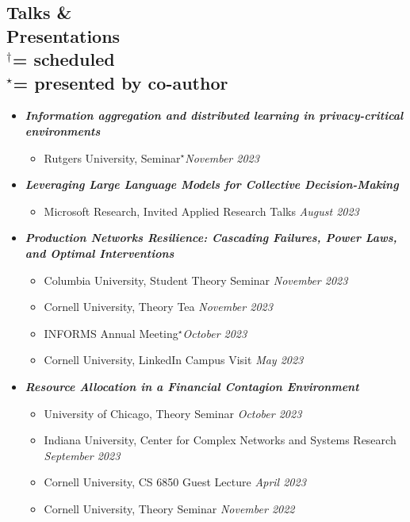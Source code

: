 \documentclass[margin]{res}
\newcommand{\scheduled}[0]{\ensuremath {^\dagger}}
\newcommand{\presentedbycoauthor}[0]{\ensuremath {^{\star}}}
\newcommand{\bemph}[1]{\textbf{\emph{#1}}}
\begin{document}
\begin{resume}
\section{Talks \& \\ Presentations \\
\footnotesize
\scheduled  = \textup{scheduled} \\ \presentedbycoauthor = \textup{presented by co-author}
}

\begin{itemize}[nosep]
	
	\item \bemph{Information aggregation and distributed learning in privacy-critical environments}
	\begin{itemize}[nosep]
	\item Rutgers University, Seminar\presentedbycoauthor \hfill \emph{November 2023}	
	\end{itemize}

	\item \bemph{Leveraging Large Language Models for Collective Decision-Making}
	\begin{itemize}[nosep]
		\item Microsoft Research, Invited Applied Research Talks \hfill \emph{August 2023}
	\end{itemize}

	\item \bemph{Production Networks Resilience: Cascading Failures, Power Laws, and Optimal Interventions}
	\begin{itemize}[nosep]
		\item Columbia University, Student Theory Seminar \hfill \emph{November 2023}
		\item Cornell University, Theory Tea \hfill \emph{November 2023}
		\item INFORMS Annual Meeting\presentedbycoauthor \hfill \emph{October 2023}
		\item Cornell University, LinkedIn Campus Visit \hfill \emph{May 2023}
	\end{itemize}

	\item \bemph{Resource Allocation in a Financial Contagion Environment}
	\begin{itemize}[nosep]
		\item University of Chicago, Theory Seminar \hfill \emph{October 2023}
		\item Indiana University, Center for Complex Networks and Systems Research \\ \hfill \emph{September 2023} 
		\item Cornell University, CS 6850 Guest Lecture \hfill \emph{April 2023}
		\item Cornell University, Theory Seminar \hfill \emph{November 2022}
	\end{itemize}
	

\end{itemize}
\end{resume}
\end{document}
